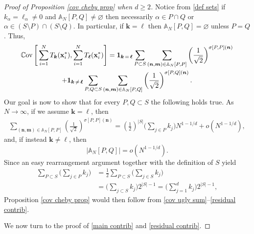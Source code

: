 \documentclass[a4paper,11pt]{article}
\numberwithin{equation}{section}
\theoremstyle{definition}
\newcommand{\eq}{\begin{equation}}
\newcommand{\qe}{\end{equation}}
\newcommand{\bs}{\boldsymbol}
\newcommand{\bv}{\mathbf}
\renewcommand{\geq}{\geqslant}
\renewcommand{\emptyset}{\varnothing}
\begin{document}
\begin{proof}[Proof of Proposition \ref{cov cheby prop} when $d\geq 2$]
Notice from \eqref{def sets}  if $k_\alpha=\ell_\alpha\neq 0$ and
$\mathbb A_N[P,Q]\neq \emptyset$ then necessarily $\alpha\in P\cap Q$
or $\alpha\in (S\setminus P)\cap(S\setminus Q)$. In particular, if
$\bs k=\bs \ell$ then $\mathbb
  A_N[P,Q]=\emptyset$ unless $P=Q$. Thus,
\begin{multline}
\label{cov ugly sum}
 \mathbb C{\rm ov}\left[\, \sum_{i=1}^NT_{\bs k}(\bv x_i^*),\sum_{i=1}^NT_{\bs \ell}(\bv x_i^*)\right]  = \bs 1_{\bs k\, =\, \bs \ell}\sum_{P\subset S}\sum_{(\bs n,\bs m)\in \mathbb A_N[P,P]}\left(\frac{1}{ \sqrt 2}\right)^{\sigma[P,P](\bs n)}\\
 +\bs 1_{\bs k\, \neq\, \bs \ell}\sum_{P,Q\subset S}\sum_{(\bs n,\bs m)\in \mathbb A_N[P,Q]}\left(\frac{1}{ \sqrt 2}\right)^{\sigma[P,Q](\bs n)}.
\end{multline}
Our goal is now to show that for every $P,Q\subset S$ the following holds true. As $N\to\infty$,
if we assume  $\bs k=\bs \ell$, then
\begin{align}
\label{main contrib}
\sum_{(\bs n,\bs m)\in \mathbb A_N[P,P]}\left(\frac{1}{ \sqrt 2}\right)^{\sigma[P,P](\bs n)}
=\left(\frac{1}{2}\right)^{ |S|}\Big(\sum_{j\in P} k_j\Big)N^{1-1/d}+o(N^{1- 1/d}),
\end{align}
and, if instead $\bs k\neq \bs \ell$, then
\eq
\label{residual contrib}
 \big|\mathbb A_N[P,Q]\big|=o(N^{1- 1/d}).
\qe
Since an easy rearrangement argument together with the definition of $S$ yield
\begin{align*}
\sum_{P\subset S}\Big( \sum_{j\in P}k_j\Big) & =\frac 12 \sum_{P\subset S}\Big( \sum_{j\in S}k_j\Big)\\
 & =\Big(\sum_{j\subset S} k_j\Big) 2^{|S|-1} = \Big(\sum_{j=1}^d k_j\Big) 2^{|S|-1} ,
\end{align*}
Proposition \ref{cov cheby prop} would then follow from \eqref{cov ugly sum}--\eqref{residual contrib}.

We now turn to the proof of \eqref{main contrib} and \eqref{residual contrib}.


\end{proof}
\end{document}
